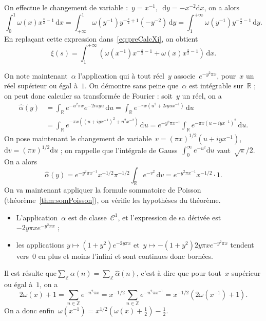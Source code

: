 \begin{dem}
			On effectue le changement de variable :~$y=x^{-1},$~$\mathrm{d}y = -x^{-2}\mathrm{d}x$, on a alors
			\[
					\int_{0}^{1} \omega(x)x^{\frac{s}{2}-1}\,\mathrm{d}x 
				=	\int_{+\infty}^{1} \omega(y^{-1})y^{-\frac{s}{2}+1}(-y^{-2})\,\mathrm{d}y
				=	\int_{1}^{+\infty} \omega(y^{-1})y^{-\frac{s}{2}-1}\,\mathrm{d}y.
			\]
			En replaçant cette expression dans~\eqref{eq:preCalcXi}, on obtient
			\begin{equation}\label{eq:deuxCalcXi}
				\xi(s) = \int_{1}^{+\infty} \left( \omega(x^{-1}) x^{-\frac{s}{2}-1}
							+ \omega(x)x^{\frac{s}{2}-1} \right)\,\mathrm{d}x.
			\end{equation}
			
			On note maintenant~$\alpha$ l'application qui à tout réel~$y$ associe~$e^{-y^2\pi x}$, pour~$x$ un réel supérieur ou égal à~$1$. On démontre sans peine que~$\alpha$ est intégrable sur~$\mathbb{R}$ ; on peut donc calculer sa transformée de Fourier : soit~$y$ un réel, on a
			\begin{align*}
						\hat{\alpha}(y)
				&	=	\int_{\mathbb{R}} e^{-u^2\pi x}e^{-2i\pi yu}\,\mathrm{d}u
					=	\int_{\mathbb{R}} e^{-\pi x(u^2+2iyux^{-1})}\,\mathrm{d}u	\\
				&	=	\int_{\mathbb{R}} e^{-\pi x((u+iyx^{-1})^2+n^2x^{-2})}\,\mathrm{d}u
					=	e^{-y^2\pi x^{-1}}\int_{\mathbb{R}} e^{-\pi x(u-iyx^{-1})^2}\,\mathrm{d}u.
			\end{align*}
			On pose maintenant le changement de variable~$v=(\pi x)^{1/2}(u+iyx^{-1})$,~$\mathrm{d}v=(\pi x)^{1/2}\mathrm{d}u$ ; on rappelle que l'intégrale de Gauss~$\int_{0}^{\infty} e^{-u^2}\mathrm{d}u$ vaut~$\sqrt{\pi}/2$. On a alors
			\[
					\hat{\alpha}(y)
				=	e^{-y^2\pi x^{-1}}x^{-1/2} \pi^{-1/2} 	\int_{\mathbb{R}} e^{-v^2}\,\mathrm{d}v
				=	e^{-y^2\pi x^{-1}}x^{-1/2} \cdot 1.
			\]
			On va maintenant appliquer la formule sommatoire de Poisson (théorème~\ref{thm:somPoisson}), on vérifie les hypothèses du théorème.
			\begin{itemize}
				\item L'application~$\alpha$ est de classe~$\mathscr{C}^1$, et l'expression de sa dérivée est~$-2y\pi xe^{-y^{2}\pi x}$ ;
				\item les applications $y\mapsto(1+y^2)e^{-2y\pi x}$ et~$y\mapsto-(1+y^2)2y\pi xe^{-y^{2}\pi x}$ tendent  vers~$0$ en plus et moins l'infini et sont continues donc bornées.
			\end{itemize}
			Il est résulte que$\sum_{\mathbb{Z}}\alpha(n) = \sum_{\mathbb{Z}}\hat{\alpha}(n)$, c'est à dire que pour tout~$x$ supérieur ou égal à~$1$, on a
			\[
					2\omega(x) + 1
				=	\sum_{n\in\mathbb{Z}} e^{-n^2\pi x} 
				=	x^{-1/2}\sum_{n\in\mathbb{Z}} e^{-n^2\pi x^{-1}}
				=	x^{-1/2}(2\omega(x^{-1})+1).
			\]
			On a donc enfin~$\omega(x^{-1}) = x^{1/2} (\omega(x)+\frac{1}{2})-\frac{1}{2}$.
			

\end{dem}
